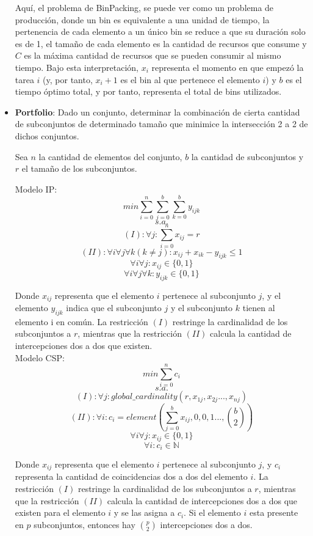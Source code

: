 \documentclass[12pt]{report}
\begin{document}
\begin{itemize}
Aquí, el problema de BinPacking, se puede ver como un problema de producción, donde un bin es equivalente a una unidad de tiempo, la pertenencia de cada elemento a un único bin se reduce a que su duración solo es de 1, el tamaño de cada elemento es la cantidad de recursos que consume y $C$ es la máxima cantidad de recursos que se pueden consumir al mismo tiempo. Bajo esta interpretación, $x_i$ representa el momento en que empezó la tarea $i$ (y, por tanto, $x_i+1$ es el bin al que pertenece el elemento $i$) y $b$ es el tiempo óptimo total, y por tanto, representa el total de bins utilizados.

\item \textbf{Portfolio}: Dado un conjunto, determinar la combinación de cierta cantidad de subconjuntos de determinado tamaño que minimice la intersección 2 a 2 de dichos conjuntos.

Sea $n$ la cantidad de elementos del conjunto, $b$ la cantidad de subconjuntos y $r$ el tamaño de los subconjuntos.

Modelo IP:
$$min \sum_{i=0}^n\sum_{j=0}^b\sum_{k=0}^by_{ijk}$$
$$s.a.$$
$$(I):\forall j:\sum_{i=0}^n x_{ij}=r$$
$$(II):\forall i \forall j \forall k(k\neq j):x_{ij}+x_{ik}-y_{ijk}\leq1$$
$$\forall i\forall j: x_{ij}\in\{0,1\}$$
$$\forall i\forall j\forall k: y_{ijk}\in\{0,1\}$$

Donde $x_{ij}$ representa que el elemento $i$ pertenece al subconjunto $j$, y el elemento $y_{ijk}$ indica que el subconjunto $j$ y el subconjunto $k$ tienen al elemento i en común. La restricción $(I)$ restringe la cardinalidad de los subconjuntos a $r$, mientras que la restricción $(II)$ calcula la cantidad de intercepciones dos a dos que existen.\\

Modelo CSP:
$$min \sum_{i=0}^n c_i$$
$$s.a.$$
$$ (I):\forall j:global\_cardinality(r,x_{1j},x_{2j}...,x_{nj})$$
$$ (II):\forall i:c_i=element(\sum_{j=0}^b x_{ij},0,0,1...,\binom{b}{2})$$
$$\forall i\forall j: x_{ij}\in\{0,1\}$$
$$\forall i: c_i\in \mathbb{N}$$

Donde $x_{ij}$ representa que el elemento $i$ pertenece al subconjunto $j$, y $c_i$ representa la cantidad de coincidencias dos a dos del elemento $i$. La restricción $(I)$ restringe la cardinalidad de los subconjuntos a $r$, mientras que la restricción $(II)$ calcula la cantidad de intercepciones dos a dos que existen para el elemento $i$ y se las asigna a $c_i$. Si el elemento $i$ esta presente en $p$ subconjuntos, entonces hay $\binom{p}{2}$ intercepciones dos a dos.


\end{itemize}
\end{document}
